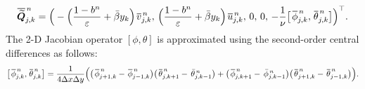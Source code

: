 \documentclass[a4paper,11pt,twoside]{article}
\numberwithin{equation}{section}
\numberwithin{figure}{section}
\numberwithin{table}{section}
\newcommand{\eps}{\varepsilon}
\newcommand{\dx}{\Delta x}
\newcommand{\dy}{\Delta y}
\newcommand{\bQ}{\bm{Q}}
\newcommand*\xbar[1]{%
	\hbox{%
		\vbox{%
			\hrule height 0.5pt %
			\kern0.3ex%
			\hbox{%
				\kern-0.05em%
				\ensuremath{#1}%
				\kern-0.02em%
			}%
		}%
	}%
}
\begin{document}
\begin{equation*}
\xbar{\widetilde{\bQ}}_{j,k}^{\,n}=\Big(-\Big(\frac{1-b^n}{\eps}+\bar{\beta}y_k\Big)\,\xbar v_{j,k}^{\,n},\,
\Big(\frac{1-b^n}{\eps}+\bar{\beta}y_k\Big)\,\xbar u_{j,k}^{\,n},\,0,\,0,\,
-\frac{1}{\nu}\big[\,\xbar{\phi}_{j,k}^{\,n},\,\xbar{\theta}_{j,k}^{\,n}\big]\Big)^\top.
\end{equation*}
The 2-D Jacobian operator $[\phi,\theta]$ is approximated using the second-order central differences as follows:
\begin{equation*}
\big[\,\xbar{\phi}_{j,k}^{\,n},\,\xbar{\theta}_{j,k}^{\,n}\big]=\frac{1}{4\dx\dy}
\Big(\big(\,\xbar{\phi}_{j+1,k}^{\,n}-\,\xbar{\phi}_{j-1,k}^{\,n}\big)\big(\,\xbar{\theta}_{j,k+1}^{\,n}-\,\bar{\theta}_{j,k-1}^{\,n}\big)+
\big(\,\xbar{\phi}_{j,k+1}^{\,n}-\,\bar{\phi}_{j,k-1}^{\,n}\big)\big(\,\xbar{\theta}_{j+1,k}^{\,n}-\,\xbar{\theta}_{j-1,k}^{\,n}\big)\Big).
\end{equation*}
	
\end{document}
